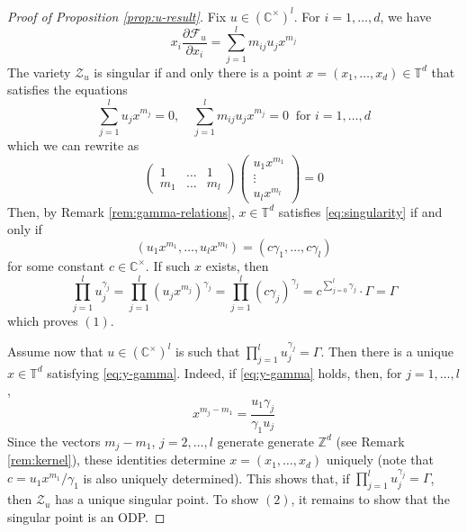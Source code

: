 \documentclass[10pt,a4paper]{amsart}
\newcommand{\CC}{\mathbb{C}}
\newcommand{\TT}{\mathbb{T}}
\newcommand{\ZZ}{\mathbb{Z}}
\begin{document}
\begin{proof}[Proof of Proposition \ref{prop:u-result}] 
Fix $u \in (\CC^\times)^l$.
For $i=1, \dots, d$, we have
\begin{equation}
 x_i \frac{\partial  \mathcal{F}_u }{\partial x_i} = \sum_{j=1}^l m_{ij} u_j x^{m_j}
\end{equation}
The variety $\mathcal{Z}_u$ is singular if and only there is a point  $x=(x_1, \dots, x_d) \in \TT^d$ that satisfies the equations
\begin{equation}
\label{eq:singularity}
\sum_{j=1}^l u_j x^{m_j}=0,  \quad 
  \sum_{j=1}^l m_{ij}  u_j x^{m_{j}}=0 \ \text{ for } i =1,\dots,d 
\end{equation} 
which we can rewrite as
\begin{equation*}
\label{eq:1m-system}
\begin{pmatrix}
1 & \dots & 1\\
m_1 & \dots & m_l
\end{pmatrix} \begin{pmatrix}
u_1 x^{m_1}\\
\vdots\\
u_l x^{m_l}
\end{pmatrix} = 0
\end{equation*}
Then, by Remark \ref{rem:gamma-relations}, $x \in \TT^d$ satisfies \eqref{eq:singularity} if and only if 
    \begin{equation}
    \label{eq:y-gamma}
    (u_1 x^{m_1}, \dots, u_l x^{m_l}) =(c \gamma_1,  \dots, c \gamma_l)\end{equation} for some constant $c \in \CC^\times$. 
If such $x$ exists, then 
\[
\prod_{j=1}^l u_j^{\gamma_j}= \prod_{j=1}^l \left( u_j x^{m_j} \right)^{\gamma_j}= \prod_{j=1}^l\left(  c\gamma_j\right)^{\gamma_j}= c^{\sum_{j=0}^l \gamma_j} \cdot \Gamma=\Gamma
\]
which proves $(1)$. 

Assume now that $u \in (\CC^\times)^l$ is such that $\prod_{j=1}^l u_j^{\gamma_j}=\Gamma$. 
Then there is a unique $x \in \TT^d$ satisfying \eqref{eq:y-gamma}. 
Indeed, if \eqref{eq:y-gamma} holds, then, for $j=1, \dots, l$, 
\[ x^{m_j-m_1}=\frac{u_1 \gamma_j}{\gamma_1 u_j}
\]
Since the vectors $m_j-m_1$, $j=2, \dots, l$ generate generate $\ZZ^d$ (see Remark \ref{rem:kernel}), these identities determine $x=(x_1, \dots, x_d)$ uniquely (note that $c=u_1x^{m_1}/\gamma_1$ is also uniquely determined).
This shows that, if $\prod_{j=1}^l u_j^{\gamma_j}=\Gamma$, then $\mathcal{Z}_u$ has a unique singular point. To show $(2)$, it remains to show that the singular point is an ODP. 


\end{proof}
\end{document}
